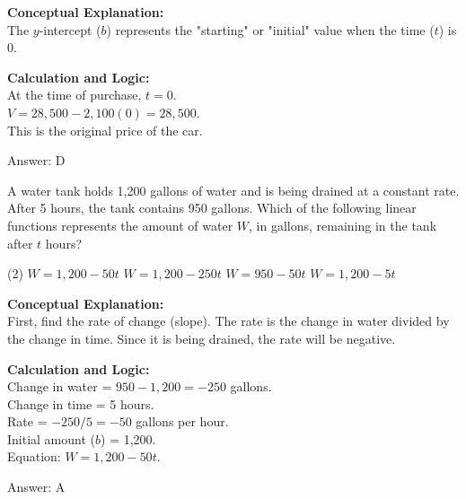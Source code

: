 \documentclass[11pt,paper=a4,answers]{exam}
\begin{document}
\begin{questions}
\begin{solution}
\textbf{Conceptual Explanation:} \\
The $y$-intercept ($b$) represents the "starting" or "initial" value when the time ($t$) is 0.

\vspace{10pt}
\textbf{Calculation and Logic:} \\
At the time of purchase, $t = 0$. \\
$V = 28,500 - 2,100(0) = 28,500$. \\
This is the original price of the car.

\vspace{15pt}
Answer: \colorbox{yellow!100}{D}
\end{solution}

\vspace{20pt}

\question
A water tank holds 1,200 gallons of water and is being drained at a constant rate. After 5 hours, the tank contains 950 gallons. Which of the following linear functions represents the amount of water $W$, in gallons, remaining in the tank after $t$ hours?
\begin{tasks}(2)
    \task $W = 1,200 - 50t$
    \task $W = 1,200 - 250t$
    \task $W = 950 - 50t$
    \task $W = 1,200 - 5t$
\end{tasks}

\begin{solution}
\textbf{Conceptual Explanation:} \\
First, find the rate of change (slope). The rate is the change in water divided by the change in time. Since it is being drained, the rate will be negative.

\vspace{10pt}
\textbf{Calculation and Logic:} \\
Change in water = $950 - 1,200 = -250$ gallons. \\
Change in time = 5 hours. \\
Rate = $-250 / 5 = -50$ gallons per hour. \\
Initial amount ($b$) = 1,200. \\
Equation: $W = 1,200 - 50t$.

\vspace{15pt}
Answer: \colorbox{yellow!100}{A}
\end{solution}

\vspace{20pt}


\end{questions}
\end{document}
